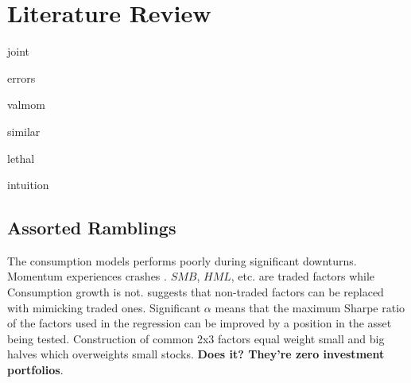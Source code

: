 
\section{Literature Review}

{joint}

{errors}

{valmom}

{similar}

{lethal}

{intuition}

\subsection{Assorted Ramblings}

The consumption models performs poorly during significant downturns.
Momentum experiences crashes \parencite{daniel2016momentum}.
$SMB$, $HML$, etc. are traded factors while Consumption growth is not.
\textcite{breeden2005intertemporal} suggests that non-traded factors can be replaced with 
mimicking traded ones.
Significant $\alpha$ means that the maximum Sharpe ratio of the factors used in the regression 
can be improved by a position in the asset being tested.
Construction of common 2x3 factors equal weight small and big halves which 
overweights small stocks. \textbf{Does it? They're zero investment portfolios}.

